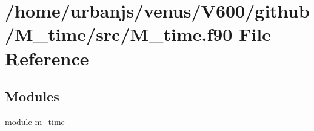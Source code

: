\hypertarget{M__time_8f90}{}\section{/home/urbanjs/venus/\+V600/github/\+M\+\_\+time/src/\+M\+\_\+time.f90 File Reference}
\label{M__time_8f90}
\subsection*{Modules}
\begin{DoxyCompactItemize}
\item 
module \mbox{\hyperlink{namespacem__time}{m\+\_\+time}}
\end{DoxyCompactItemize}
